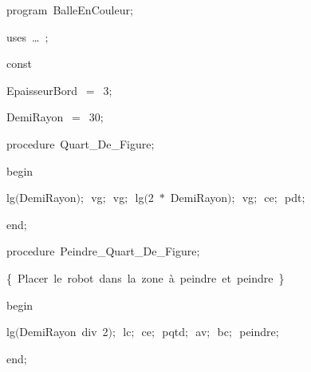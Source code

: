 
{
\parindent {}
\medskip

\carrenoir
\vspace{\neglskip}\mbox{\blc  \idt  \mcl program\idt \label{prog:BalleEnCouleur}\ BalleEnCouleur$;$
}\par 
\vspace{\neglskip}\mbox{\blc \blk\idt \mcl uses\idt \ \ldots\ $;$
}\par 
\medskip

\pagebreak[3] 
\vspace{\neglskip}\mbox{\blc  \blk\idt  \mcl const\idt }\par 
\vspace{\neglskip}\mbox{\blc  \blk\blk\idt  EpaisseurBord\ $=$\ 3$;$}\par 
\vspace{\neglskip}\mbox{\blc  \blk\blk\idt  DemiRayon\ $=$\ 30$;$}\par 
\medskip

\pagebreak[3] 
\vspace{\neglskip}\mbox{\blc  \blk\idt  \mcl procedure\idt \ Quart\_De\_Figure$;$}\par 
\vspace{\neglskip}\mbox{\blc  \blk\idt  \mcl begin\idt }\par 
\vspace{\neglskip}\mbox{\blc  \blk\blk\idt  lg$($DemiRayon$)$$;$\ vg$;$\ vg$;$\ lg$($2\ $\ast$\ DemiRayon$)$$;$\ vg$;$\ ce$;$\ pdt$;$}\par 
\vspace{\neglskip}\mbox{\blc  \blk\idt  \mcl end\idt $;$}\par 
\medskip

\pagebreak[3] 
\vspace{\neglskip}\mbox{\blc  \blk\idt  \mcl procedure\idt \ Peindre\_Quart\_De\_Figure$;$}\par 
\vspace{\neglskip}\mbox{\blc  \blk\blk\blk\idt  \cmt  \{\ Placer\ le\ robot\ dans\ la\ zone\ à\ peindre\ et\ peindre\ \}\idt }\par 
\vspace{\neglskip}\mbox{\blc  \blk\idt  \mcl begin\idt }\par 
\vspace{\neglskip}\mbox{\blc  \blk\blk\blk\idt  lg$($DemiRayon\ \mcl div\idt \ 2$)$$;$\ lc$;$\ ce$;$\ pqtd$;$\ av$;$\ bc$;$\ peindre$;$}\par 
\vspace{\neglskip}\mbox{\blc  \blk\idt  \mcl end\idt $;$}\par 
\medskip

}
